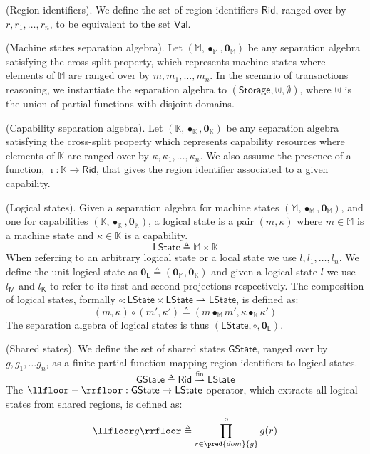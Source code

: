  (Region identifiers). We define the set of region identifiers $\mathsf{Rid}$, ranged over by $r, r_1, \ldots, r_n$, to be equivalent to the set $\mathsf{Val}$.

\param (Machine states separation algebra). Let $(\mathbb{M}, \bullet_\mathbb{M}, \mathbf{0}_\mathbb{M})$ be any separation algebra satisfying the cross-split property, which represents machine states where elements of $\mathbb{M}$ are ranged over by $m, m_1, \ldots, m_n$. In the scenario of transactions reasoning, we instantiate the separation algebra to $(\mathsf{Storage}, \uplus, \emptyset)$, where $\uplus$ is the union of partial functions with disjoint domains.

\param (Capability separation algebra). Let $(\mathbb{K}, \bullet_\mathbb{K}, \mathbf{0}_\mathbb{K})$ be any separation algebra satisfying the cross-split property which represents capability resources where elements of $\mathbb{K}$ are ranged over by $\kappa, \kappa_1, \ldots, \kappa_n$. We also assume the presence of a function, $\imath : \mathbb{K} \rightarrow \mathsf{Rid}$, that gives the region identifier associated to a given capability.

 (Logical states). Given a separation algebra for machine states $(\mathbb{M}, \bullet_\mathbb{M}, \mathbf{0}_\mathbb{M})$, and one for capabilities $(\mathbb{K}, \bullet_\mathbb{K}, \mathbf{0}_\mathbb{K})$, a logical state is a pair $(m, \kappa)$ where $m \in \mathbb{M}$ is a machine state and $\kappa \in \mathbb{K}$ is a capability.
\[
	\mathsf{LState} \triangleq \mathbb{M} \times \mathbb{K}
\]
When referring to an arbitrary logical state or a local state we use $l, l_1, \ldots, l_n$. We define the unit logical state as $\mathbf{0}_\mathsf{L} \triangleq (\mathbf{0}_\mathbb{M}, \mathbf{0}_\mathbb{K})$ and given a logical state $l$ we use $l_\mathsf{M}$ and $l_\mathsf{K}$ to refer to its first and second projections respectively. The composition of logical states, formally $\circ : \mathsf{LState} \times \mathsf{LState} \rightharpoonup \mathsf{LState}$, is defined as:
\[
	(m, \kappa) \circ (m', \kappa') \triangleq (m \bullet_\mathbb{M} m', \kappa \bullet_\mathbb{K} \kappa')
\]
The separation algebra of logical states is thus $(\mathsf{LState}, \circ, \mathbf{0}_\mathsf{L})$.

 (Shared states). We define the set of shared states $\mathsf{GState}$, ranged over by $g, g_1, \ldots g_n$, as a finite partial function mapping region identifiers to logical states.
\[
	\mathsf{GState} \triangleq \mathsf{Rid} \overset{\text{fin}}{\rightharpoonup} \mathsf{LState}
\]
The $\llfloor - \rrfloor : \mathsf{GState} \rightarrow \mathsf{LState}$ operator, which extracts all logical states from shared regions, is defined as:
\[
	\llfloor g \rrfloor \triangleq \prod^{\circ}_{r \in \pred{dom}{g}} g(r)
\]


